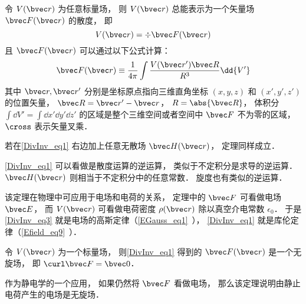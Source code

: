 

\begin{theorem}{}
令 $V(\bvec r)$ 为任意标量场， 则 $V(\bvec r)$ 总能表示为一个矢量场 $\bvec F(\bvec r)$ 的散度， 即
\begin{equation}\label{DivInv_eq3}
V(\bvec r) = \div \bvec F(\bvec r)
\end{equation}
且 $\bvec F(\bvec r)$ 可以通过以下公式计算：
\begin{equation}\label{DivInv_eq1}
\bvec F(\bvec r) \equiv \frac{1}{4\pi}\int \frac{V(\bvec r') \bvec R}{R^3} \dd{V'}
\end{equation}
其中 $\bvec r, \bvec r'$ 分别是坐标原点指向三维直角坐标 $(x, y, z)$ 和 $(x', y', z')$ 的位置矢量， $\bvec R = \bvec r' - \bvec r$， $R = \abs{\bvec R}$， 体积分 $\int\dd{V'} = \int\dd{x'}\dd{y'}\dd{z'}$ 的区域是整个三维空间或者空间中 $\bvec F$ 不为零的区域， $\cross$ 表示矢量叉乘．

若在\autoref{DivInv_eq1} 右边加上任意无散场 $\bvec H(\bvec r)$， 定理同样成立．
\end{theorem}

\autoref{DivInv_eq1} 可以看做是散度运算的逆运算， 类似于不定积分是求导的逆运算． $\bvec H(\bvec r)$ 则相当于不定积分中的任意常数． 旋度也有类似的逆运算．

该定理在物理中可应用于电场和电荷的关系， 定理中的 $\bvec F$ 可看做电场 $\bvec E$， 而 $V(\bvec r)$ 可看做电荷密度 $\rho(\bvec r)$ 除以真空介电常数 $\epsilon_0$． 于是\autoref{DivInv_eq3} 就是电场的高斯定律（\autoref{EGauss_eq1}~）， \autoref{DivInv_eq1} 就是库伦定律（\autoref{Efield_eq9}~）．

\begin{theorem}{}\label{DivInv_the1}
令 $V(\bvec r)$ 为一个标量场， 则\autoref{DivInv_eq1} 得到的 $\bvec F(\bvec r)$ 是一个无旋场， 即 $\curl \bvec F = \bvec 0$．
\end{theorem}

作为静电学的一个应用， 如果仍然将 $\bvec F$ 看做电场， 那么该定理说明由静止电荷产生的电场是无旋场．


